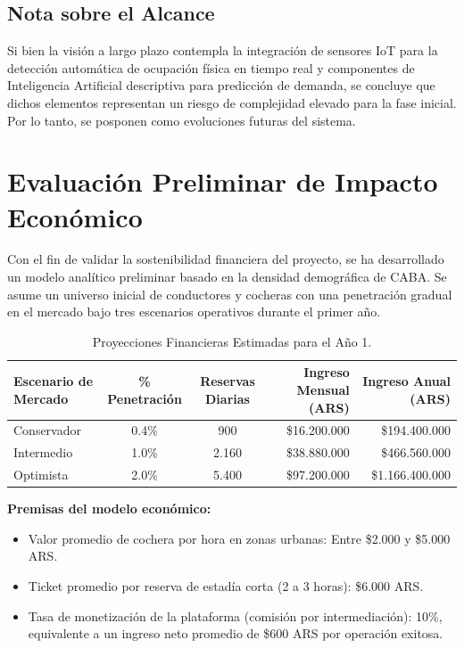 \documentclass[11pt, a4paper]{article}
\begin{document}
\subsection{Nota sobre el Alcance}
Si bien la visión a largo plazo contempla la integración de sensores IoT para la detección automática de ocupación física en tiempo real y componentes de Inteligencia Artificial descriptiva para predicción de demanda, se concluye que dichos elementos representan un riesgo de complejidad elevado para la fase inicial. Por lo tanto, se posponen como evoluciones futuras del sistema.


\section{Evaluación Preliminar de Impacto Económico}
Con el fin de validar la sostenibilidad financiera del proyecto, se ha desarrollado un modelo analítico preliminar basado en la densidad demográfica de CABA. Se asume un universo inicial de conductores y cocheras con una penetración gradual en el mercado bajo tres escenarios operativos durante el primer año.

\begin{table}[htbp]
    \centering
    \caption{Proyecciones Financieras Estimadas para el Año 1.}
    \vspace{0.2cm}
    \begin{tabular}{l c c r r}
        \toprule
        \textbf{Escenario de Mercado} & \textbf{\% Penetración} & \textbf{Reservas Diarias} & \textbf{Ingreso Mensual (ARS)} & \textbf{Ingreso Anual (ARS)} \\
        \midrule
        Conservador & 0.4\% & 900 & \$16.200.000 & \$194.400.000 \\
        Intermedio  & 1.0\% & 2.160 & \$38.880.000 & \$466.560.000 \\
        Optimista   & 2.0\% & 5.400 & \$97.200.000 & \$1.166.400.000 \\
        \bottomrule
    \end{tabular}
    \label{tab:impacto_economico}
\end{table}

\textbf{Premisas del modelo económico:}
\begin{itemize}
    \item Valor promedio de cochera por hora en zonas urbanas: Entre \$2.000 y \$5.000 ARS.
    \item Ticket promedio por reserva de estadía corta (2 a 3 horas): \$6.000 ARS.
    \item Tasa de monetización de la plataforma (comisión por intermediación): 10\%, equivalente a un ingreso neto promedio de \$600 ARS por operación exitosa.
\end{itemize}
\end{document}
